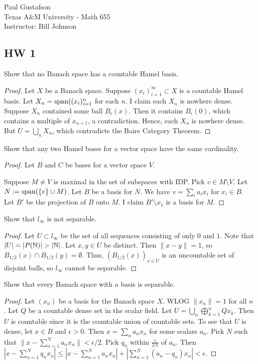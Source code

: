 \documentclass{article}
\begin{document}
\noindent Paul Gustafson\\
\noindent Texas A\&M University - Math 655\\ 
\noindent Instructor: Bill Johnson

\subsection*{HW 1}
 Show that no Banach space has a countable Hamel basis.
\begin{proof}
Let $X$ be a Banach space.  Suppose $(x_i)_{i=1}^\infty \subset X$ is a countable Hamel basis.  Let $X_n = \operatorname{span}((x_i)_{i=1}^n$ for each $n$.  I claim each $X_n$ is nowhere dense. Suppose $X_n$ contained some ball $B_\epsilon(x)$. Then it contains $B_\epsilon(0)$, which contains a multiple of $x_{n+1}$, a contradiction.  Hence, each $X_n$ is nowhere dense.  But $U = \bigcup_n X_n$, which contradicts the Baire Category Theorem.
\end{proof}

 Show that any two Hamel bases for a vector space have the same cardinality.
\begin{proof}
Let $B$ and $C$ be bases for a vector space $V$.  

Suppose $M \neq V$ is maximal in the set of subspaces with IDP.    Pick $v \in M \setminus V$.  Let $N := \operatorname{span}(\{v\} \cup M)$. Let $B$ be a basis for $N$. We have $v = \sum_i a_i x_i$ for $x_i \in B$.   Let $B'$ be the projection of $B$ onto $M$.  I claim $B' \setminus x_1$ is a basis for $M$.

\end{proof}

 Show that $l_\infty$ is not separable.
\begin{proof}
Let $U \subset l_\infty$ be the set of all sequences consisting of only $0$ and $1$.  Note that $|U| = |P(\mathbb{N})| > |\mathbb{N}| $.  Let $x,y \in U$ be distinct. Then $\|x - y \| = 1$, so $B_{1/2}(x) \cap B_{1/2}(y) = \emptyset$.  Thus, $(B_{1/2}(x))_{x\in U}$ is an uncountable set of disjoint balls, so $l_\infty$ cannot be separable.
\end{proof}


 Show that every Banach space with a basis is separable.
\begin{proof}
Let $(x_n)$ be a basis for the Banach space $X$. WLOG $\|x_n\| = 1$ for all $n$. Let $Q$ be a countable dense set in the scalar field.  Let $U = \bigcup_n \bigoplus_{k=1}^n Q x_k$. Then $U$ is countable since it is the countable union of countable sets.  To see that $U$ is dense, let $x \in B$ and $\epsilon > 0$. Then $x = \sum_n a_n x_n$ for some scalars $a_n$. Pick $N$ such that $\|x - \sum_{n=1}^N a_n x_n\| < \epsilon/2$.  Pick $q_n$ within $\frac \epsilon {2N}$  of $a_n$.  Then $ |x - \sum_{n=1}^N q_n x_n| \le |x - \sum_{n=1}^N a_n x_n| + |\sum_{n=1}^N (a_n - q_n)x_n| < \epsilon$.
\end{proof}
\end{document}

